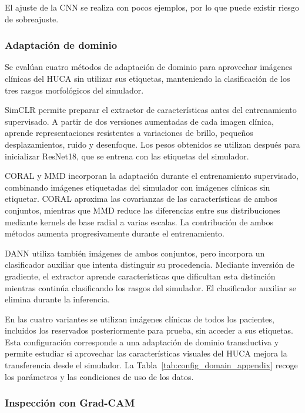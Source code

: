 El ajuste de la CNN se realiza con pocos ejemplos, por lo que puede existir riesgo de sobreajuste.

\subsubsection{Adaptación de dominio}
\label{sec:adaptacion_cnn}

Se evalúan cuatro métodos de adaptación de dominio para aprovechar imágenes clínicas del HUCA sin utilizar sus etiquetas, manteniendo la clasificación de los tres rasgos morfológicos del simulador.

SimCLR permite preparar el extractor de características antes del entrenamiento supervisado. A partir de dos versiones aumentadas de cada imagen clínica, aprende representaciones resistentes a variaciones de brillo, pequeños desplazamientos, ruido y desenfoque. Los pesos obtenidos se utilizan después para inicializar ResNet18, que se entrena con las etiquetas del simulador.

CORAL y MMD incorporan la adaptación durante el entrenamiento supervisado, combinando imágenes etiquetadas del simulador con imágenes clínicas sin etiquetar. CORAL aproxima las covarianzas de las características de ambos conjuntos, mientras que MMD reduce las diferencias entre sus distribuciones mediante kernels de base radial a varias escalas. La contribución de ambos métodos aumenta progresivamente durante el entrenamiento.

DANN utiliza también imágenes de ambos conjuntos, pero incorpora un clasificador auxiliar que intenta distinguir su procedencia. Mediante inversión de gradiente, el extractor aprende características que dificultan esta distinción mientras continúa clasificando los rasgos del simulador. El clasificador auxiliar se elimina durante la inferencia.

En las cuatro variantes se utilizan imágenes clínicas de todos los pacientes, incluidos los reservados posteriormente para prueba, sin acceder a sus etiquetas. Esta configuración corresponde a una adaptación de dominio transductiva y permite estudiar si aprovechar las características visuales del HUCA mejora la transferencia desde el simulador. La Tabla~\ref{tab:config_domain_appendix} recoge los parámetros y las condiciones de uso de los datos.

\subsubsection{Inspección con Grad-CAM}

